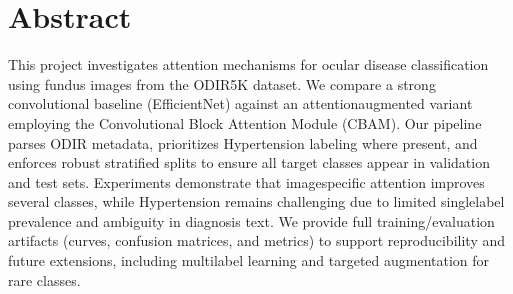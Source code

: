 \section*{Abstract}
This project investigates attention mechanisms for ocular disease classification using fundus images from the ODIR\textendash 5K dataset. We compare a strong convolutional baseline (EfficientNet) against an attention\textendash augmented variant employing the Convolutional Block Attention Module (CBAM). Our pipeline parses ODIR metadata, prioritizes Hypertension labeling where present, and enforces robust stratified splits to ensure all target classes appear in validation and test sets. Experiments demonstrate that image\textendash specific attention improves several classes, while Hypertension remains challenging due to limited single\textendash label prevalence and ambiguity in diagnosis text. We provide full training/evaluation artifacts (curves, confusion matrices, and metrics) to support reproducibility and future extensions, including multi\textendash label learning and targeted augmentation for rare classes.


